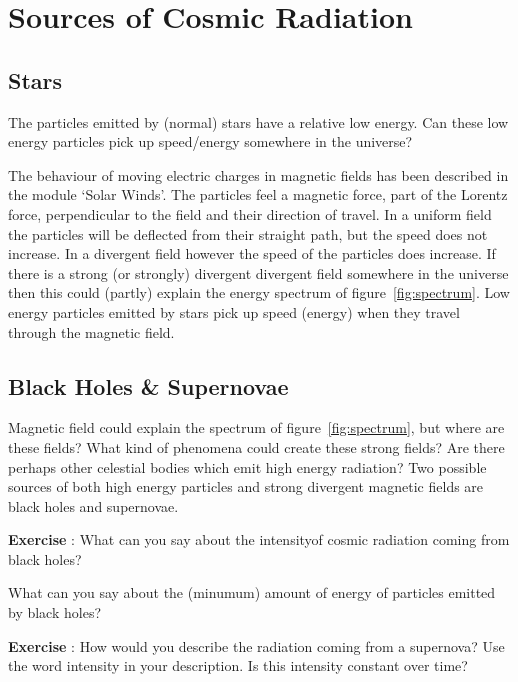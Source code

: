 \documentclass[12pt,a4paper]{article}
\numberwithin{equation}{section}
\numberwithin{figure}{section}
\newcounter{Exercise}
\numberwithin{table}{section}
\begin{document}
\section{Sources of Cosmic Radiation}
\subsection{Stars}
The particles emitted by (normal) stars have a relative low energy. Can these low energy particles pick up speed/energy somewhere in the universe?

The behaviour of moving electric charges in magnetic fields has been described in the module `Solar Winds'. The particles feel a magnetic force, part of the Lorentz force, perpendicular to the field and their direction of travel. In a uniform field the particles will be deflected from their straight path, but the speed does not increase. In a divergent field however the speed of the particles does increase. If there is a strong (or strongly) divergent divergent field somewhere in the universe then this could (partly) explain the energy spectrum of figure~\ref{fig:spectrum}. Low energy particles emitted by stars pick up speed (energy) when they travel through the magnetic field.

\subsection{Black Holes \& Supernovae}
Magnetic field could explain the spectrum of figure~\ref{fig:spectrum}, but where are these fields? What kind of phenomena could create these strong fields? Are there perhaps other celestial bodies which emit high energy radiation? Two possible sources of both high energy particles and strong divergent magnetic fields are black holes and supernovae.

\begin{shaded}
\textbf{Exercise \theExercise {}} : What can you say about the intensity\footnotemark of cosmic radiation coming from black holes?

What can you say about the (minumum) amount of energy of particles emitted by black holes?\end{shaded}

\begin{shaded}
\textbf{Exercise \theExercise {}} : How would you describe the radiation coming from a supernova? Use the word intensity in your description. Is this intensity constant over time?\end{shaded}
\end{document}
